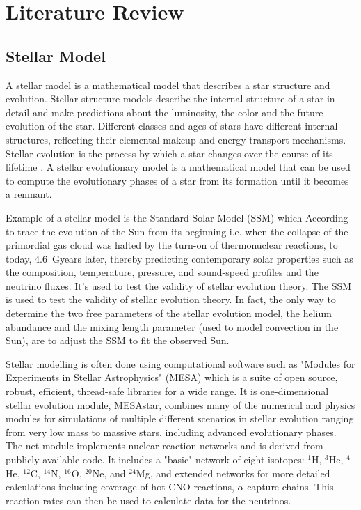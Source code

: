 \section{Literature Review}

\subsection{Stellar Model}

A stellar model is a mathematical model that describes a star structure and evolution. Stellar structure models describe the internal structure of a star in detail and make predictions about the luminosity, the color and the future evolution of the star. Different classes and ages of stars have different internal structures, reflecting their elemental makeup and energy transport mechanisms. Stellar evolution is the process by which a star changes over the course of its lifetime . A stellar evolutionary model is a mathematical model that can be used to compute the evolutionary phases of a star from its formation until it becomes a remnant.

Example of a stellar model is the Standard Solar Model (SSM) which According to  trace the evolution of the Sun from its beginning i.e. when the collapse of the primordial gas
cloud was halted by the turn-on of thermonuclear reactions, to today, \SI{4.6}{\giga years} later, thereby predicting
contemporary solar properties such as the composition, temperature, pressure, and sound-speed profiles and
the neutrino fluxes. It's used to test the validity of stellar evolution theory. The SSM is used to test the validity of stellar evolution theory. In fact, the only way to determine the two free parameters of the stellar evolution model, the helium abundance and the mixing length parameter (used to model convection in the Sun), are to adjust the SSM to fit the observed Sun.

Stellar modelling is often done using computational software such as "Modules for Experiments in Stellar Astrophysics" (MESA) which is a suite of open source, robust, efficient, thread-safe libraries for a wide range. It is one-dimensional stellar evolution module, MESAstar, combines many of the numerical and physics modules for simulations of multiple different scenarios in stellar evolution ranging from very low mass to massive stars, including advanced evolutionary phases. The net module implements nuclear reaction networks and is derived from publicly available code. It includes a "basic" network of eight isotopes: $^{1}$H, $^{3}$He, $^{4}$He, $^{12}$C, $^{14}$N, $^{16}$O, $^{20}$Ne, and $^{24}$Mg, and extended networks for more detailed calculations including coverage of hot CNO reactions, $\alpha$-capture chains. This reaction rates can then be used to calculate data for the neutrinos.

